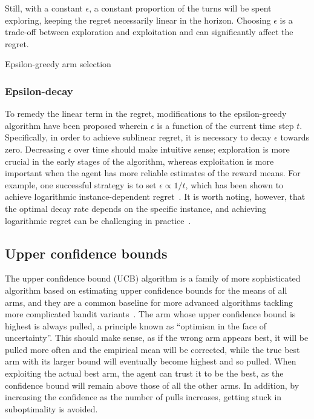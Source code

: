 Still, with a constant $\epsilon$, a constant proportion of the turns will be spent exploring, keeping the regret necessarily linear in the horizon.
Choosing $\epsilon$ is a trade-off between exploration and exploitation and can significantly affect the regret.

\begin{algorithm}
    \caption{Epsilon-greedy arm selection}
    \label{alg:eps_greedy}
    \eIf{$t \leq mk$}{
    \Return $(t \mod k) + 1$\;
    }{
    Sample $u$ from $[0,1)$ uniformly\;
    \eIf{$u < \epsilon$}{
        Sample $a$ from $\mathcal{A}$ uniformly\;
        \Return $a$\;
    }{
        \Return $\argmax_{a \in \mathcal{A}}\hat{\mu}_a$\;
    }
    }
\end{algorithm}

\subsubsection{Epsilon-decay}
To remedy the linear term in the regret, modifications to the epsilon-greedy algorithm have been proposed wherein $\epsilon$ is a function of the current time step $t$.
Specifically, in order to achieve sublinear regret, it is necessary to decay $\epsilon$ towards zero.
Decreasing $\epsilon$ over time should make intuitive sense; exploration is more crucial in the early stages of the algorithm, whereas exploitation is more important when the agent has more reliable estimates of the reward means.
For example, one successful strategy is to set $\epsilon \propto 1/t$, which has been shown to achieve logarithmic instance-dependent regret~\autocite{auer2002}.
It is worth noting, however, that the optimal decay rate depends on the specific instance, and achieving logarithmic regret can be challenging in practice~\autocite{bubeck2012}.


\subsection{Upper confidence bounds}
\label{sec:ucb}
The upper confidence bound (UCB) algorithm is a family of more sophisticated algorithm based on estimating upper confidence bounds for the means of all arms, and they are a common baseline for more advanced algorithms tackling more complicated bandit variants~\autocite{li2010}.
The arm whose upper confidence bound is highest is always pulled, a principle known as \enquote{optimism in the face of uncertainty}.
This should make sense, as if the wrong arm appears best, it will be pulled more often and the empirical mean will be corrected, while the true best arm with its larger bound will eventually become highest and so pulled.
When exploiting the actual best arm, the agent can trust it to be the best, as the confidence bound will remain above those of all the other arms.
In addition, by increasing the confidence as the number of pulls increases, getting stuck in suboptimality is avoided.

